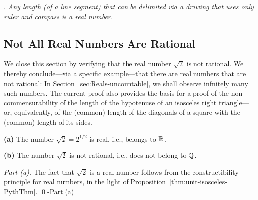 .  {\em
  Any length (of a line segment) that can be delimited via a drawing
  that uses only ruler and compass is a real number.}



\subsection{Not All Real Numbers Are Rational}
\label{sec:Real-vs-Rational}

We close this section by verifying that the real number $\sqrt{2}$ is
not rational.  We thereby conclude---via a specific example---that
there are real numbers that are not rational: In
Section~\ref{sec:Reals-uncountable}, we shall observe infnitely many
such numbers.  The current proof also provides the basis for a proof
of the non-commensurability of the length of the hypotenuse of an
isosceles right triangle---or, equivalently, of the (common) length of
the diagonals of a square with the (common) length of its sides.
 

\begin{prop}
\label{thm:sqrt(2)}
{\bf (a)}
The number $\sqrt{2} = 2^{1/2}$ is real, i.e., belongs to $\mathbb{R}$.

{\bf (b)}
The number $\sqrt{2}$ is not rational, i.e., does not belong to $\mathbb{Q}$.
\end{prop}

\begin{proof}[Part (a)]
The fact that $\sqrt{2}$ is a real number follows from the
constructibility principle for real numbers, in the light of
Proposition~\ref{thm:unit-isosceles-PythThm}.
\qed-Part (a)
\end{proof}

\medskip

